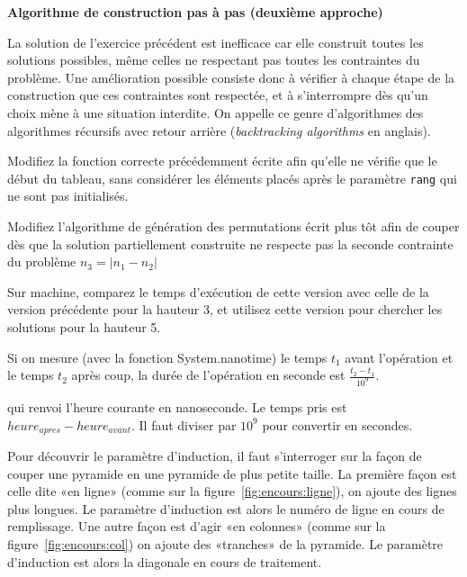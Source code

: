 \documentclass[10pt]{article}\usepackage[correction,nu]{esial}
\begin{document}
\begin{Exercice}\textbf{Algorithme de construction pas à pas (deuxième approche)}

  \noindent La solution de l'exercice précédent est inefficace car elle
  construit toutes les solutions possibles, même celles ne respectant pas toutes
  les contraintes du problème. Une amélioration possible consiste donc à
  vérifier à chaque étape de la construction que ces contraintes sont respectée,
  et à s'interrompre dès qu'un choix mène à une situation interdite.
  On appelle ce genre d'algorithmes des algorithmes récursifs avec retour
  arrière (\textit{backtracking algorithms} en anglais).

  \begin{Question}
    Modifiez la fonction correcte précédemment écrite afin qu'elle ne vérifie
    que le début du tableau, sans considérer les éléments placés après le
    paramètre \texttt{rang} qui ne sont pas initialisés.
  \end{Question}

  \begin{Reponse}
    \newcommand*\FancyVerbStartString{// BEGIN CORRECTE}
    \newcommand*\FancyVerbStopString{// END CORRECTE}
  \end{Reponse}

  \Question %
  Modifiez l'algorithme de génération des permutations écrit plus tôt afin de
  couper dès que la solution partiellement construite ne respecte pas la seconde
  contrainte du problème $n_3=\left|n_1-n_2\right|$

  \begin{Reponse}
    \newcommand*\FancyVerbStartString{// BEGIN GENERE}
    \newcommand*\FancyVerbStopString{// END GENERE}
  \end{Reponse}

  \Question %
  Sur machine, comparez le temps d'exécution de cette version avec celle de la
  version précédente pour la hauteur 3, et utilisez cette version pour chercher
  les solutions pour la hauteur 5. 

  Si on mesure (avec la fonction System.nanotime) le temps $t_1$ avant
  l'opération et le temps $t_2$ après coup, la durée de l'opération en seconde
  est $\frac{t_2-t_1}{10^9}$.

 qui renvoi
  l'heure courante en nanoseconde. Le temps pris est
  $heure_{apres}-heure_{avant}$. Il faut diviser par $10^{9}$ pour convertir en secondes.

Pour découvrir le paramètre d'induction,
  il faut s'interroger sur la façon de couper une pyramide en une pyramide de
  plus petite taille. La première façon est celle dite «en ligne» (comme sur la
  figure~\ref{fig:encours:ligne}), on ajoute des lignes plus longues. Le
  paramètre d'induction est alors le numéro de ligne en cours de
  remplissage. Une autre façon est d'agir «en colonnes» (comme sur la
  figure~\ref{fig:encours:col}) on ajoute des «tranches» de la pyramide. Le
  paramètre d'induction est alors la diagonale en cours de traitement.
\end{Exercice}
\end{document}
